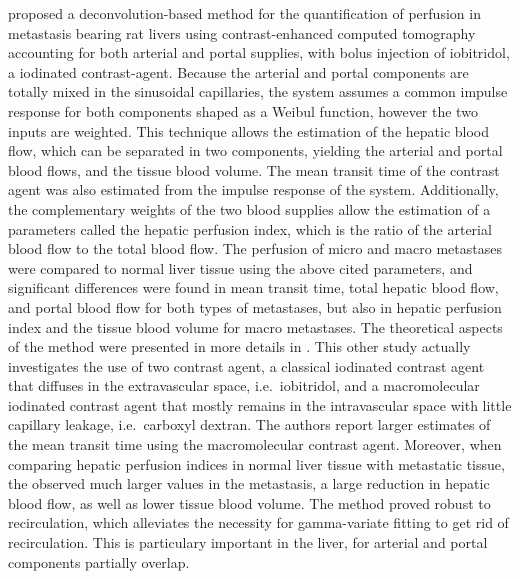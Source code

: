 \citet{Cuenod:2001ef} proposed a deconvolution-based method for the quantification of perfusion in metastasis bearing rat livers using contrast-enhanced computed tomography accounting for both arterial and portal supplies, with bolus injection of iobitridol, a iodinated contrast-agent.
Because the arterial and portal components are totally mixed in the sinusoidal capillaries, the system assumes a common impulse response for both components shaped as a Weibul function, however the two inputs are weighted.
This technique allows the estimation of the hepatic blood flow, which can be separated in two components, yielding the arterial and portal blood flows, and the tissue blood volume.
The mean transit time of the contrast agent was also estimated from the impulse response of the system.
Additionally, the complementary weights of the two blood supplies allow the estimation of a parameters called the hepatic perfusion index, which is the ratio of the arterial blood flow to the total blood flow.
The perfusion of micro and macro metastases were compared to normal liver tissue using the above cited parameters, and significant differences were found in mean transit time, total hepatic blood flow, and portal blood flow for both types of metastases, but also in hepatic perfusion index and the tissue blood volume for macro metastases.
The theoretical aspects of the method were presented in more details in \cite{Cuenod:2002cm}.
This other study actually investigates the use of two contrast agent, a classical iodinated contrast agent that diffuses in the extravascular space, i.e.~iobitridol, and a macromolecular iodinated contrast agent that mostly remains in the intravascular space with little capillary leakage, i.e.~carboxyl dextran.
The authors report larger estimates of the mean transit time using the macromolecular contrast agent.
Moreover, when comparing hepatic perfusion indices in normal liver tissue with metastatic tissue, the observed much larger values in the metastasis, a large reduction in hepatic blood flow, as well as lower tissue blood volume.
The method proved robust to recirculation, which alleviates the necessity for gamma-variate fitting to get rid of recirculation. 
This is particulary important in the liver, for arterial and portal components partially overlap.

